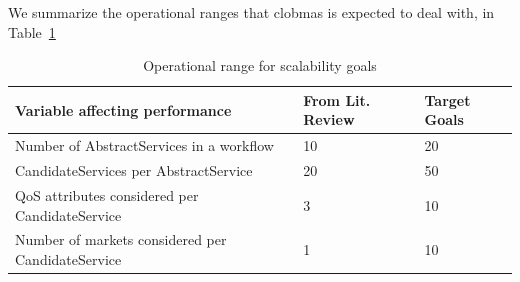 \documentclass[10pt,journal,compsoc]{IEEEtran}
\begin{document}
We summarize the operational ranges that clobmas is expected to deal with, in Table~\ref{tbl:scalability_targets}
\begin{table}[H]
\centering
\renewcommand{\arraystretch}{1.5}
\begin{tabular}{p{10cm}p{4cm}p{3cm}}
	\toprule
	\textbf{Variable affecting performance} & \textbf{From Lit. Review} & \textbf{Target Goals}\\ 
	\midrule
	Number of AbstractServices in a workflow & \hspace{1.8cm} 10 & \hspace{1.5cm} 20 \\ 
	CandidateServices per AbstractService & \hspace{1.8cm} 20 & \hspace{1.5cm} 50 \\ 
	QoS attributes considered per CandidateService & \hspace{1.8cm} 3 & \hspace{1.5cm} 10 \\ 
	Number of markets considered per CandidateService & \hspace{1.8cm} 1 & \hspace{1.5cm} 10 \\ 
	\bottomrule
\end{tabular}
\caption{Operational range for scalability goals \label{tbl:scalability_targets}}
\end{table}
\end{document}
